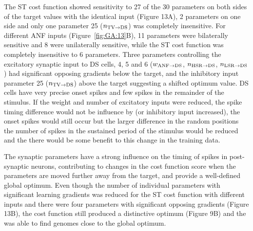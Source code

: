 The ST cost function showed sensitivity to 27 of the 30 parameters on
both sides of the target values with the identical {\ANF} input (Figure
13A), 2 parameters on one side and only one parameter 25 ($n_{{\rm
    TV}\to {\rm DS}} $) was completely insensitive. For different ANF
inputs (Figure~\ref{fig:GA:13}B), 11 parameters were bilaterally
sensitive and 8 were unilaterally sensitive, while the ST cost
function was completely insensitive to 6 parameters. Three parameters
controlling the excitatory synaptic input to DS cells, 4, 5 and 6
($w_{{\rm ANF}\to {\rm DS}} $, $n_{{\rm HSR}\to {\rm DS}} $, $n_{{\rm
    LSR}\to {\rm DS}} $) had significant opposing gradients below the
target, and the inhibitory input parameter 25 ($n_{{\rm TV}\to {\rm
    DS}} $) above the target suggesting a shifted optimum value.  DS
cells have very precise onset spikes and few spikes in the remainder
of the stimulus.  If the weight and number of excitatory inputs were
reduced, the spike timing difference would not be influence by (or
inhibitory input increased), the onset spikes would still occur but
the larger difference in the random positions the number of spikes in
the sustained period of the stimulus would be reduced and the there
would be some benefit to this change in the training data.

\smallskip{}

The synaptic parameters have a strong influence on the timing of
spikes in post-synaptic neurons, contributing to changes in the cost
function score when the parameters are moved further away from the
target, and provide a well-defined global optimum. Even though the
number of individual parameters with significant learning gradients
was reduced for the ST cost function with different inputs and there
were four parameters with significant opposing gradients (Figure 13B),
the cost function still produced a distinctive optimum (Figure 9B) and
the {\GA} was able to find genomes close to the global optimum.

\smallskip{}



